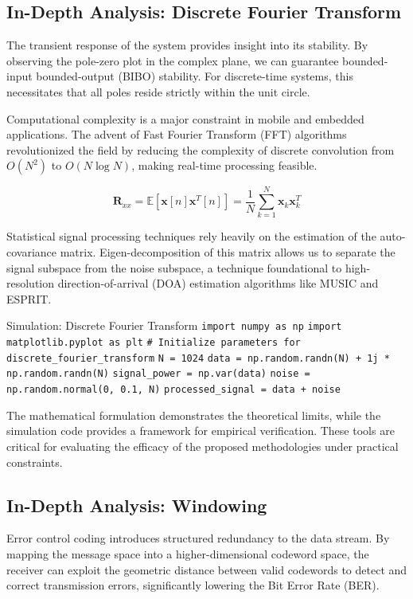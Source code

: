 \subsection{In-Depth Analysis: Discrete Fourier Transform}
The transient response of the system provides insight into its stability. By observing the pole-zero plot in the complex plane, we can guarantee bounded-input bounded-output (BIBO) stability. For discrete-time systems, this necessitates that all poles reside strictly within the unit circle.

Computational complexity is a major constraint in mobile and embedded applications. The advent of Fast Fourier Transform (FFT) algorithms revolutionized the field by reducing the complexity of discrete convolution from $O(N^2)$ to $O(N \log N)$, making real-time processing feasible.

\begin{equation}
    \mathbf{R}_{xx} = \mathbb{E}[\mathbf{x}[n]\mathbf{x}^T[n]] = \frac{1}{N} \sum_{k=1}^{N} \mathbf{x}_k \mathbf{x}_k^T
\end{equation}

Statistical signal processing techniques rely heavily on the estimation of the auto-covariance matrix. Eigen-decomposition of this matrix allows us to separate the signal subspace from the noise subspace, a technique foundational to high-resolution direction-of-arrival (DOA) estimation algorithms like MUSIC and ESPRIT.

\begin{pythonbox}{Simulation: Discrete Fourier Transform}
\texttt{import numpy as np}
\texttt{import matplotlib.pyplot as plt}
\texttt{}
\texttt{\# Initialize parameters for discrete\_fourier\_transform}
\texttt{N = 1024}
\texttt{data = np.random.randn(N) + 1j * np.random.randn(N)}
\texttt{signal\_power = np.var(data)}
\texttt{noise = np.random.normal(0, 0.1, N)}
\texttt{processed\_signal = data + noise}
\end{pythonbox}

\vspace{0.5cm}
The mathematical formulation demonstrates the theoretical limits, while the simulation code provides a framework for empirical verification. These tools are critical for evaluating the efficacy of the proposed methodologies under practical constraints.


\subsection{In-Depth Analysis: Windowing}
Error control coding introduces structured redundancy to the data stream. By mapping the message space into a higher-dimensional codeword space, the receiver can exploit the geometric distance between valid codewords to detect and correct transmission errors, significantly lowering the Bit Error Rate (BER).

